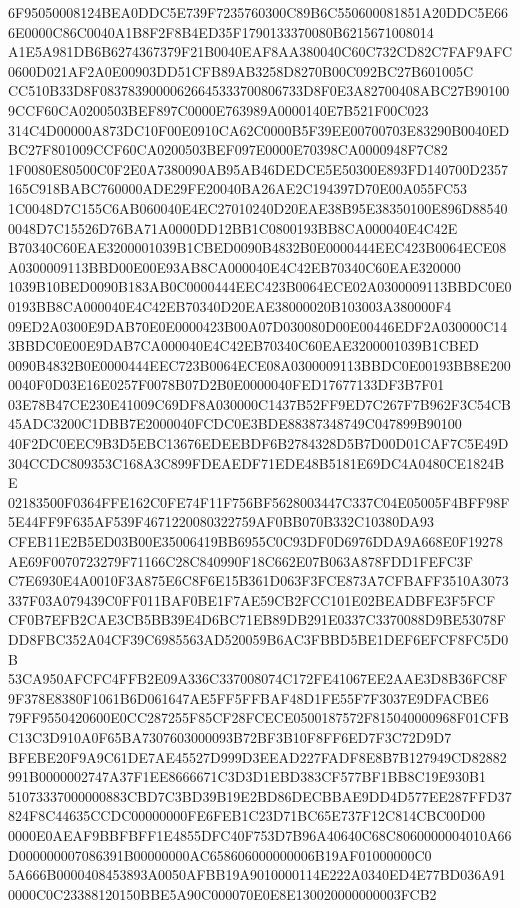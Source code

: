 \documentclass[UTF8,fontset=fandol,zihao=-4,a4paper]{ctexart}
\begin{document}
{{6F95050008124BEA0DDC5E739F7235760300C89B6C550600081851A20DDC5E666E0000C86C0040A1B8F2F8B4ED35F1790133370080B6215671008014
A1E5A981DB6B6274367379F21B0040EAF8AA380040C60C732CD82C7FAF9AFC0600D021AF2A0E00903DD51CFB89AB3258D8270B00C092BC27B601005C
CC510B33D8F08378390000626645333700806733D8F0E3A82700408ABC27B901009CCF60CA0200503BEF897C0000E763989A0000140E7B521F00C023
314C4D00000A873DC10F00E0910CA62C0000B5F39EE00700703E83290B0040EDBC27F801009CCF60CA0200503BEF097E0000E70398CA0000948F7C82
1F0080E80500C0F2E0A7380090AB95AB46DEDCE5E50300E893FD140700D2357165C918BABC760000ADE29FE20040BA26AE2C194397D70E00A055FC53
1C0048D7C155C6AB060040E4EC27010240D20EAE38B95E38350100E896D885400048D7C15526D76BA71A0000DD12BB1C0800193BB8CA000040E4C42E
B70340C60EAE3200001039B1CBED0090B4832B0E0000444EEC423B0064ECE08A0300009113BBD00E00E93AB8CA000040E4C42EB70340C60EAE320000
1039B10BED0090B183AB0C0000444EEC423B0064ECE02A0300009113BBDC0E00193BB8CA000040E4C42EB70340D20EAE38000020B103003A380000F4
09ED2A0300E9DAB70E0E0000423B00A07D030080D00E00446EDF2A030000C143BBDC0E00E9DAB7CA000040E4C42EB70340C60EAE3200001039B1CBED
0090B4832B0E0000444EEC723B0064ECE08A0300009113BBDC0E00193BB8E2000040F0D03E16E0257F0078B07D2B0E0000040FED17677133DF3B7F01
03E78B47CE230E41009C69DF8A030000C1437B52FF9ED7C267F7B962F3C54CB45ADC3200C1DBB7E2000040FCDC0E3BDE88387348749C047899B90100
40F2DC0EEC9B3D5EBC13676EDEEBDF6B2784328D5B7D00D01CAF7C5E49D304CCDC809353C168A3C899FDEAEDF71EDE48B5181E69DC4A0480CE1824BE
02183500F0364FFE162C0FE74F11F756BF5628003447C337C04E05005F4BFF98F5E44FF9F635AF539F4671220080322759AF0BB070B332C10380DA93
CFEB11E2B5ED03B00E35006419BB6955C0C93DF0D6976DDA9A668E0F19278AE69F0070723279F71166C28C840990F18C662E07B063A878FDD1FEFC3F
C7E6930E4A0010F3A875E6C8F6E15B361D063F3FCE873A7CFBAFF3510A3073337F03A079439C0FF011BAF0BE1F7AE59CB2FCC101E02BEADBFE3F5FCF
CF0B7EFB2CAE3CB5BB39E4D6BC71EB89DB291E0337C3370088D9BE53078FDD8FBC352A04CF39C6985563AD520059B6AC3FBBD5BE1DEF6EFCF8FC5D0B
53CA950AFCFC4FFB2E09A336C337008074C172FE41067EE2AAE3D8B36FC8F9F378E8380F1061B6D061647AE5FF5FFBAF48D1FE55F7F3037E9DFACBE6
79FF9550420600E0CC287255F85CF28FCECE0500187572F815040000968F01CFBC13C3D910A0F65BA7307603000093B72BF3B10F8FF6ED7F3C72D9D7
BFEBE20F9A9C61DE7AE45527D999D3EEAD227FADF8E8B7B127949CD82882991B0000002747A37F1EE8666671C3D3D1EBD383CF577BF1BB8C19E930B1
51073337000000883CBD7C3BD39B19E2BD86DECBBAE9DD4D577EE287FFD37824F8C44635CCDC00000000FE6FEB1C23D71BC65E737F12C814CBC00D00
0000E0AEAF9BBFBFF1E4855DFC40F753D7B96A40640C68C8060000004010A66D000000007086391B00000000AC658606000000006B19AF01000000C0
5A666B0000408453893A0050AFBB19A9010000114E222A0340ED4E77BD036A910000C0C23388120150BBE5A90C000070E0E8E130020000000003FCB2
}}
\end{document}
